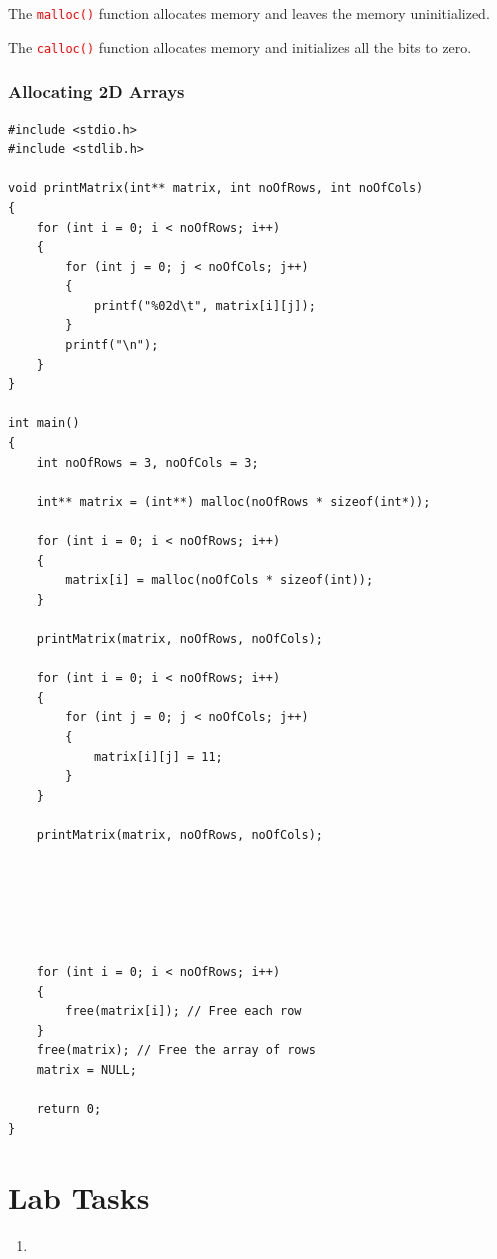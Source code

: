 \documentclass[12pt]{article}
\begin{document}
\noindent The \textcolor{red}{\texttt{malloc()}} function allocates memory and leaves the memory uninitialized. 

\noindent The \textcolor{red}{\texttt{calloc()}} function allocates memory and initializes all the bits to zero. \\

\newpage
{}
\section*{Allocating 2D Arrays}

\begin{verbatim}
#include <stdio.h>
#include <stdlib.h>

void printMatrix(int** matrix, int noOfRows, int noOfCols)
{
    for (int i = 0; i < noOfRows; i++)
    {
        for (int j = 0; j < noOfCols; j++)
        {
            printf("%02d\t", matrix[i][j]);
        }
        printf("\n");
    }
}

int main()
{
    int noOfRows = 3, noOfCols = 3;

    int** matrix = (int**) malloc(noOfRows * sizeof(int*));

    for (int i = 0; i < noOfRows; i++)
    {
        matrix[i] = malloc(noOfCols * sizeof(int));
    }

    printMatrix(matrix, noOfRows, noOfCols);

    for (int i = 0; i < noOfRows; i++)
    {
        for (int j = 0; j < noOfCols; j++)
        {
            matrix[i][j] = 11;
        }
    }

    printMatrix(matrix, noOfRows, noOfCols);






    for (int i = 0; i < noOfRows; i++)
    {
        free(matrix[i]); // Free each row
    }
    free(matrix); // Free the array of rows
    matrix = NULL;

    return 0;
}
\end{verbatim}






\newpage
{}
\part*{\centering Lab Tasks}


\begin{enumerate}
    \item 
\end{enumerate}
\end{document}
